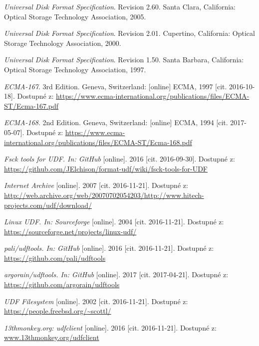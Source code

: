 \begin{literatura}{99}
	
    \emph{Universal Disk Format Specification}. Revision 2.60. Santa Clara, California: Optical Storage Technology Association, 2005.

    \emph{Universal Disk Format Specification}. Revision 2.01. Cupertino, California: Optical Storage Technology Association, 2000.

    \emph{Universal Disk Format Specification}. Revision 1.50. Santa Barbara, California: Optical Storage Technology Association, 1997.

    \emph{ECMA-167}. 3rd Edition. Geneva, Switzerland: [online] ECMA, 1997 [cit. 2016-10-18]. Dostupné z: \url{https://www.ecma-international.org/publications/files/ECMA-ST/Ecma-167.pdf}

    \emph{ECMA-168}. 2nd Edition. Geneva, Switzerland: [online] ECMA, 1994 [cit. 2017-05-07]. Dostupné z: \url{https://www.ecma-international.org/publications/files/ECMA-ST/Ecma-168.pdf}

    \emph{Fsck tools for UDF. In: GitHub}\/ [online]. 2016 [cit. 2016-09-30]. Dostupné z: \url{https://github.com/JElchison/format-udf/wiki/fsck-tools-for-UDF}

    \emph{Internet Archive}\/ [online]. 2007 [cit. 2016-11-21]. Dostupné z: \url{http://web.archive.org/web/20070702054203/http://www.hitech-projects.com/udf/download/}

    \emph{Linux UDF. In: Sourceforge}\/ [online]. 2004 [cit. 2016-11-21]. Dostupné z: \url{https://sourceforge.net/projects/linux-udf/}

    \emph{pali/udftools. In: GitHub}\/ [online]. 2016 [cit. 2016-11-21]. Dostupné z: \url{https://github.com/pali/udftools}

    \emph{argorain/udftools. In: GitHub}\/ [online]. 2017 [cit. 2017-04-21]. Dostupné z: \url{https://github.com/argorain/udftools}

    \emph{UDF Filesystem}\/ [online]. 2002 [cit. 2016-11-21]. Dostupné z: \url{https://people.freebsd.org/~scottl/}

    \emph{13thmonkey.org: udfclient}\/ [online]. 2016 [cit. 2016-11-21]. Dostupné z: \url{www.13thmonkey.org/udfclient}  


\end{literatura}
